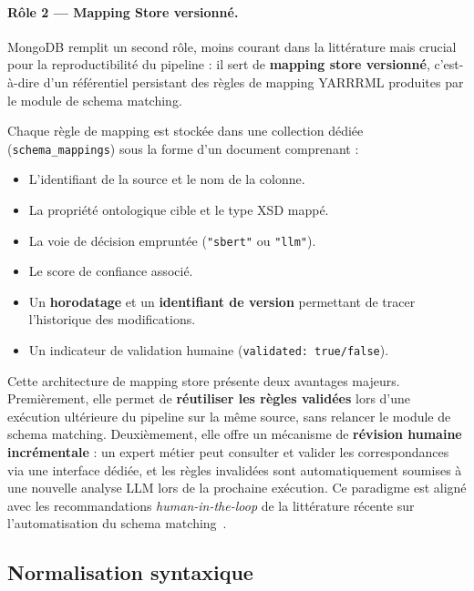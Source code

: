 \paragraph{Rôle 2 — Mapping Store versionné.}
MongoDB remplit un second rôle, moins courant dans la littérature
mais crucial pour la reproductibilité du pipeline :
il sert de \textbf{mapping store versionné}, c'est-à-dire d'un
référentiel persistant des règles de mapping YARRRML produites
par le module de schema matching.

Chaque règle de mapping est stockée dans une collection dédiée
(\texttt{schema\_mappings}) sous la forme d'un document comprenant :
\begin{itemize}
    \item L'identifiant de la source et le nom de la colonne.
    \item La propriété ontologique cible et le type XSD mappé.
    \item La voie de décision empruntée (\texttt{"sbert"} ou
          \texttt{"llm"}).
    \item Le score de confiance associé.
    \item Un \textbf{horodatage} et un \textbf{identifiant de version}
          permettant de tracer l'historique des modifications.
    \item Un indicateur de validation humaine (\texttt{validated: true/false}).
\end{itemize}

Cette architecture de mapping store présente deux avantages
majeurs.
Premièrement, elle permet de \textbf{réutiliser les règles validées}
lors d'une exécution ultérieure du pipeline sur la même source,
sans relancer le module de schema matching.
Deuxièmement, elle offre un mécanisme de \textbf{révision humaine
incrémentale} : un expert métier peut consulter et valider les
correspondances via une interface dédiée, et les règles invalidées
sont automatiquement soumises à une nouvelle analyse LLM lors de
la prochaine exécution.
Ce paradigme est aligné avec les recommandations
\textit{human-in-the-loop} de la littérature récente sur
l'automatisation du schema matching~\cite{branco2025integration}.

\subsection{Normalisation syntaxique}

